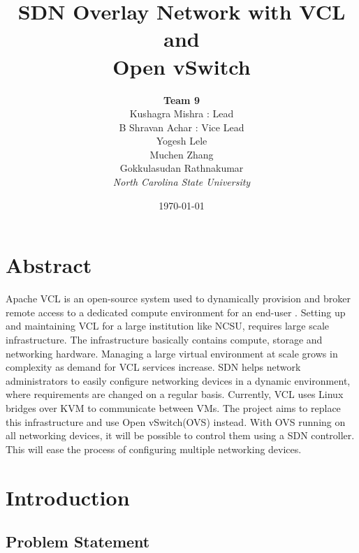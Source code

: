 \documentclass{article}
\title{\textbf{SDN Overlay Network with VCL and \\Open vSwitch}}
\date{\today}
\author{\textbf{Team 9} \\Kushagra Mishra : Lead\\
B Shravan Achar : Vice Lead \\ Yogesh Lele \\ Muchen Zhang \\ Gokkulasudan Rathnakumar\\ \textit{North Carolina State University}}
\begin{document}
\maketitle
\pagebreak
\tableofcontents
\pagebreak
\listoffigures
\listoftables
\newpage

\section{Abstract}
Apache VCL is an open-source system used to dynamically provision and broker remote access to a dedicated compute environment for an end-user \cite{vcl}. Setting up and maintaining VCL for a large institution like NCSU, requires large scale infrastructure. The infrastructure basically contains compute, storage and networking hardware. Managing a large virtual environment at scale grows in complexity as demand for VCL services increase. SDN helps network administrators to easily configure networking devices in a dynamic environment, where requirements are changed on a regular basis. Currently, VCL uses Linux bridges over KVM to communicate between VMs. The project aims to replace this infrastructure and use Open vSwitch(OVS) instead. With OVS running on all networking devices, it will be possible to control them using a SDN controller. This will ease the process of configuring multiple networking devices.



\section{Introduction}

\subsection{Problem Statement}
\end{document}
